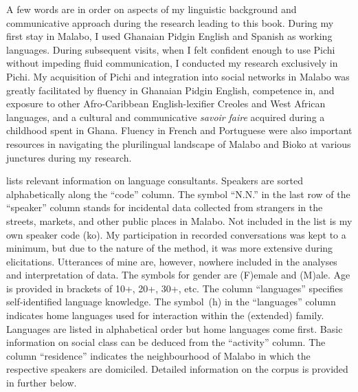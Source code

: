 A few words are in order on aspects of my linguistic background and communicative approach during the research leading to this book. During my first stay in Malabo, I used Ghanaian Pidgin English and Spanish as working languages. During subsequent visits, when I felt confident enough to use Pichi without impeding fluid communication, I conducted my research exclusively in Pichi. My acquisition of Pichi and integration into social networks in Malabo was greatly facilitated by fluency in Ghanaian Pidgin English, competence in, and exposure to other Afro-Caribbean English-lexifier Creoles and West African languages, and a cultural and communicative \textit{savoir} \textit{faire} acquired during a childhood spent in Ghana. Fluency in French and Portuguese were also important resources in navigating the plurilingual landscape of Malabo and Bioko at various junctures during my research.


 lists relevant information on language consultants. Speakers are sorted alphabetically along the “code” column. The symbol “N.N.” in the last row of the “speaker” column stands for incidental data collected from strangers in the streets, markets, and other public places in Malabo. Not included in the list is my own speaker code (ko). My participation in recorded conversations was kept to a minimum, but due to the nature of the method, it was more extensive during elicitations. Utterances of mine are, however, nowhere included in the analyses and interpretation of data. The symbols for gender are (F)emale and (M)ale. Age is provided in brackets of 10+, 20+, 30+, etc. The column “languages” specifies self-identified language knowledge. The symbol~(h) in the “languages” column indicates home languages used for interaction within the (extended) family. Languages are listed in alphabetical order but home languages come first. Basic information on social class can be deduced from the “activity” column. The column “residence” indicates the neighbourhood of Malabo in which the respective speakers are domiciled. Detailed information on the corpus is provided in  further below.


